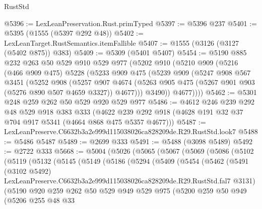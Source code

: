 \begin{lexlean}{RustStd}
\begin{coremodule}
@5396 := LexLeanPreservation.Rust.primTyped
@5397 := @5396 @237
@5401 := @5395 (@1555 (@5397 @292 @48))
@5402 := LexLeanTarget.RustSemantics.itemFallible
@5407 := @1555 (@3126 (@3127 (@5402 @875)) @383)
@5409 := @5309 (@5401 @5407)
@5454 := @5190
    @885
    @232
    @263
    @50
    @529
    @910
    @529
    @977
    (@5202
      @910
      (@5210
        @909
        (@5216
          (@466 @909 @475)
          @5228
          (@5233
            @909
            @475
            (@5239
              @909
              (@5247
                @908
                @567
                @3451
                (@5252
                  @908
                  (@5257
                    @907
                    @4674
                    (@5263 @905 @475 (@5267 @901 @903 (@5276 @890 @507 @4659 @3327)) @4677)))
                @3490))
            @4677))))
@5462 := @5301 @248 @259 @262 @50 @529 @920 @529 @977
@5486 := @4612
    @246
    @239
    @292
    @48
    @529
    @918
    @383
    @333
    (@4622 @239 @292 @918 (@4628 @191 @32 @37 @704 @917 @5341 (@4664 @868 @475 @5357 @4677)))
@5487 := LexLeanPreserve.C6632b3a2e999d115038026ca828209de.R29.RustStd.look7
@5488 := @5486 @5487
@5489 := @2699 @333
@5491 := @5488 (@3098 @5489)
@5492 := @2722 @333
@5668 := @5004
    (@5026
      (@5065
        (@5067
          (@5069
            (@5086
              (@5102
                (@5119
                  (@5132
                    (@5145
                      (@5149
                        (@5186
                          (@5294
                            (@5409
                              (@5454
                                (@5462
                                  (@5491
                                    (@3102 @5492)
                                    LexLeanPreserve.C6632b3a2e999d115038026ca828209de.R29.RustStd.fal7
                                    @3131)
                                  (@5190
                                    @920
                                    @259
                                    @262
                                    @50
                                    @529
                                    @949
                                    @529
                                    @975
                                    (@5200
                                      @259
                                      @50
                                      @949
                                      (@5206
                                        @255
                                        @48
                                        @33

\end{coremodule}
\end{lexlean}
